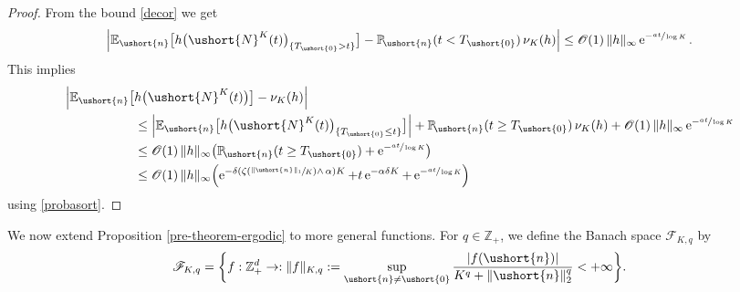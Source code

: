 \documentclass[11pt]{article}
\makeatletter
\newcommand{\Psfrac}[2]{(\sfrac{#1}{#2})}
\newcommand{\scaleto}[2]{#1}
\DeclareRobustCommand{\mathds}[1]{\csname jepbb@#1\endcsname}
\let\mathcal\mathscr
\numberwithin{equation}{section}
\theoremstyle{plain}
\theoremstyle{definition}
\newcommand{\proba}{{\mathbb{P}}}
\newcommand{\E}{{\mathbb{E}}}
\newcommand{\zentiers}{{\mathbb{Z}}}
\newcommand{\domaine}{\zentiers_{+}^{d}}
\newcommand{\Oun}{\mathcal{O}(1)}
\newcommand{\sK}{K}
\newcommand{\un}{\mathds{1}}
\newcommand{\vecn}{\ushort{n}}
\newcommand{\veczer}{\ushort{0}}
\newcommand{\leproc}{\ushort{N}^{K}}
\newcommand{\nuk}{\nu_{K}}\let\snuk\nuk
\newcommand{\e}{\operatorname{e}}
\newcommand{\normdeux}[1]{\|#1\|_{2}}\let\snormdeux\normdeux
\makeatother
\begin{document}
\begin{proof}
From the bound \eqref{decor} we get
\[
\left|\E_{\vecn}\bigl[h\bigl(\leproc(t)\bigr)\un_{\{T_{\veczer}>t\}}\bigr]
-\proba\!_{\vecn}(t<T_{\veczer})\,\nuk(h)\right|
\le\Oun\, \|h\|_{\scaleto{\infty}{3pt}}\e^{-\sfrac{a t}{\log K}}.
\]
This implies
\begin{align*}
\Bigl|\E_{\vecn}\bigl[&h\bigl(\leproc(t)\bigr)\bigr]-\nuk(h)\Bigr| \\
& \le
\left|\E_{\vecn} \bigl[h\bigl(\leproc(t)\bigr)\un_{\{T_{\veczer}\le t\}} \bigr]\right|
+\proba\!_{\vecn}(t\ge T_{\veczer})\,\nuk(h)+\Oun\, \|h\|_{\scaleto{\infty}{3pt}}\e^{-\sfrac{a t}{\log K}}
\\
& \le \Oun\, \|h\|_{\scaleto{\infty}{3pt}}\bigl(\proba\!_{\vecn}(t\ge T_{\veczer})+\e^{-\sfrac{a t}{\log K}}\bigr)
\\
& \le \Oun\, \|h\|_{\scaleto{\infty}{3pt}}\Bigl(\e^{-\delta\left(\zeta\Psfrac{\|\vecn\|_{1}}{K}\wedge\,\alpha\right)K}
+t \e^{-\alpha\delta K}+\e^{-\sfrac{a t}{\log K}}\Bigr)
\end{align*}
using \eqref{probasort}.
\end{proof}

We now extend Proposition \ref{pre-theorem-ergodic} to more general functions.
For $q\in\zentiers_+$, we define the Banach space
$\mathscr{F}\!_{\sK,q}$ by
\begin{equation}\label{observables}
\mathscr{F}\!_{\sK,q}
=\biggl\{f: \domaine \rightarrow \mathds{R} :
\|f\|_{\sK,q}:= \sup_{ \vecn\neq \veczer} \frac{|f(\vecn)|}{K^q+\normdeux{\vecn}^{\scaleto{q}{3.6pt}}}<+\infty \biggr\}.
\end{equation}
\end{document}
